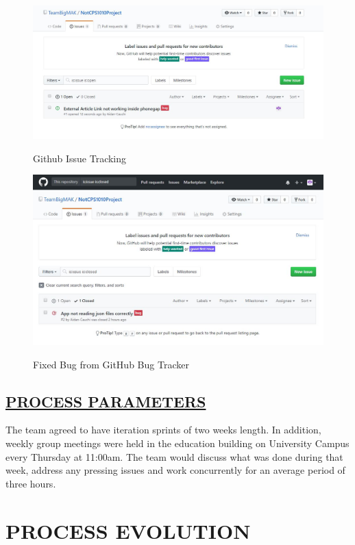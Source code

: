 \documentclass[paper=a4,fontsize=11pt]{article}
\newcommand{\sepspace}{\vspace*{1em}}		%
\newcommand{\MainSection}[1]{\section*{\uppercase{#1}}}
\newcommand{\SectionPart}[1]{\subsection*{\uppercase{#1}}}
\begin{document}
\begin{figure}[H]
  \caption{Github Issue Tracking}
  \includegraphics[width=15cm]{BugTracking/pic1.JPG}\\
  \sepspace
\end{figure}
\begin{figure}[H]
  \caption{Fixed Bug from GitHub Bug Tracker}
  \includegraphics[width=15cm]{BugTracking/pic2.JPG}\\
\end{figure}

\sepspace

\SectionPart{\ul{Process Parameters}}
The team agreed to have iteration sprints of two weeks length. In addition, weekly group
meetings were held in the education building on University Campus every Thursday at 11:00am.
The team would discuss what was done during that week, address any pressing issues and work
concurrently for an average period of three hours.


\newpage


\MainSection{Process Evolution}
\end{document}
